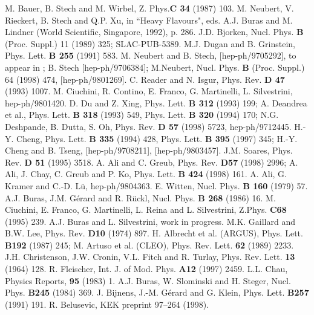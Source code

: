 \begin{thebibliography}{999}
M. Bauer, B. Stech and M. Wirbel, { Z. Phys.}{\bf C 34} (1987) 103.
M. Neubert, V. Rieckert, B. Stech and Q.P. Xu, in ``Heavy Flavours",
 eds. A.J. Buras and M. Lindner (World Scientific, Singapore, 1992),
p. 286.
J.D. Bjorken,
{ Nucl. Phys.} {\bf B } (Proc. Suppl.) 11 (1989) 325;
SLAC-PUB-5389.
M.J. Dugan and B. Grinstein,
{ Phys. Lett.} {\bf B 255} (1991) 583.
M. Neubert and B. Stech,
[hep-ph/9705292], to appear in \cite{HFII};
B. Stech [hep-ph/9706384];
M.Neubert, Nucl. Phys. {\bf B } (Proc. Suppl.) 64 (1998) 474, 
[hep-ph/9801269].
C. Reader and N. Isgur,
{ Phys. Rev.} {\bf D 47} (1993) 1007.
M. Ciuchini, R. Contino, E. Franco, G. Martinelli, L. Silvestrini,
hep-ph/9801420.
D. Du and Z. Xing, { Phys. Lett.} {\bf B 312} (1993) 199;
A. Deandrea et al., { Phys. Lett.} {\bf B 318} (1993) 549,
{ Phys. Lett.} {\bf B 320} (1994) 170;
N.G. Deshpande, B. Dutta, S. Oh, { Phys. Rev.} {\bf D 57} (1998) 5723,
hep-ph/9712445.
H.-Y. Cheng, { Phys. Lett.} {\bf B 335} (1994) 428,
{ Phys. Lett.} {\bf B 395} (1997) 345;
H.-Y. Cheng and B. Tseng, [hep-ph/9708211], [hep-ph/9803457].
J.M. Soares, { Phys. Rev.} {\bf D 51} (1995) 3518.
A. Ali and C. Greub, { Phys. Rev.} {\bf D57} (1998) 2996;
A. Ali, J. Chay, C. Greub and P. Ko, 
{ Phys. Lett.} {\bf B 424} (1998) 161.
A. Ali, G. Kramer and C.-D. L\"u, hep-ph/9804363.
 E. Witten,
{ Nucl. Phys.} {\bf B 160} (1979) 57.
 A.J. Buras, J.M. G{\'e}rard and R. R\"uckl,
{ Nucl. Phys.} {\bf B 268} (1986) 16.
M. Ciuchini, E. Franco, G. Martinelli, L. Reina and L. Silvestrini, 
Z.Phys. {\bf C68} (1995) 239.
A.J. Buras and L. Silvestrini, work in progress.
{ M.K. Gaillard and B.W. Lee,} 
{ Phys. Rev.} {\bf D10} (1974) 897.
{ H. Albrecht et al. (ARGUS)}, { Phys. Lett.} {\bf B192} (1987) 245;
{ M. Artuso et al. (CLEO)}, { Phys. Rev. Lett.} {\bf 62} (1989) 2233.
{ J.H. Christenson, J.W. Cronin, V.L. Fitch and R. Turlay},
{ Phys. Rev. Lett.} {\bf 13} (1964) 128. 
{ R. Fleischer}, { Int. J. of Mod. Phys.}
 {\bf A12} (1997) 2459.
L.L. Chau, { Physics Reports}, {\bf 95} (1983) 1.
A.J. Buras, W. Slominski and H. Steger,
{ Nucl. Phys.} {\bf B245} (1984) 369.
J. Bijnens, J.-M. G{\'e}rard and G. Klein, 
{ Phys. Lett.} {\bf B257} (1991) 191.
R. Belusevic, KEK preprint 97--264 (1998).

\end{thebibliography}
